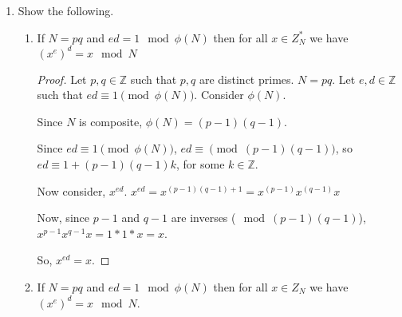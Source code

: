 \documentclass{article}
\begin{document}
\begin{enumerate}
    Show that, in contrast, $[[X \mod p ] \mod N ]$ need not equal $[X \mod N]$.

    \begin{proof}
      Suppose towards contradiction that $\forall p, N \in \mathbb{Z}$
      $\left[\left[X \mod p\right] \mod N\right] = \left[X \mod N\right]$.

      Let $b = \left[X \mod p\right]$. Let $X = bN + a$.

      Then $\left[\left[X \mod p\right] \mod N\right] = b \mod N$, but $\left[X
      \mod N\right] = \left[(bN + a) \mod N\right]$, and since $N \mid bN$ for
      some $b \in \mathbb{Z}$, $\left[(bN + a) \mod N\right] = \left[a \mod
      N\right]$.

      So, for some value of $a, b \in \mathbb{Z}$, if $x = bN + a, \left[\left[X
      \mod p\right] \mod N\right] \neq \left[X \mod N\right]$.

      Therefore, we can see that no such $X$ exists.
    \end{proof}

  \item Show the following.
    \begin{enumerate}
      \item If $N = pq$ and $ed = 1 \mod \phi(N)$ then for all $x \in Z^{*}_N$ 
        we have $(x^e)^d = x \mod N$

        \begin{proof}
          Let $p, q \in \mathbb{Z}$ such that $p, q$ are distinct primes. $N =
          pq$. Let $e, d \in \mathbb{Z}$ such that $ed \equiv 1 \pmod{\phi(N)}$.
          Consider $\phi(N)$.

          Since $N$ is composite, $\phi(N) = (p - 1)(q - 1)$.

          Since $ed \equiv 1 \pmod{\phi(N)}$, $ed \equiv \pmod{(p - 1)(q - 1)}$,
          so $ed \equiv 1 + (p - 1)(q - 1)k$, for some $k \in \mathbb{Z}$.

          Now consider, $x^{ed}$. $x^{ed} = x^{(p - 1)(q - 1) + 1} = x^{(p -
            1)}x^{(q - 1)}x$

          Now, since $p - 1$ and $q - 1$ are inverses ($\mod (p - 1)(q - 1)$),
          $x^{p - 1}x^{q - 1}x = 1 * 1 * x = x$.

          So, $x^{ed} = x$.
         \end{proof}

      \item If $N = pq$ and $ed = 1 \mod \phi(N)$ then for all $x \in Z_N$ we
        have $(x^e)^d = x \mod N$.


\end{enumerate}
\end{enumerate}
\end{document}
